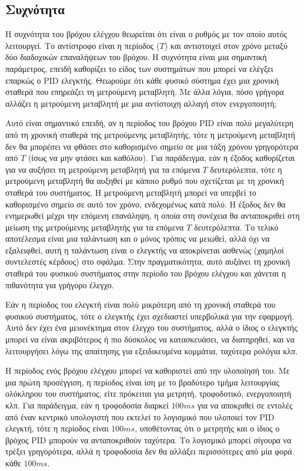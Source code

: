 \subsection{Συχνότητα}

Η συχνότητα του βρόχου ελέγχου θεωρείται ότι είναι ο ρυθμός με τον οποίο αυτός λειτουργεί. Το αντίστροφο είναι η περίοδος ($Τ$) και αντιστοιχεί στον χρόνο μεταξύ δύο διαδοχικών επαναλήψεων του βρόχου. Η συχνότητα είναι μια σημαντική παράμετρος, επειδή καθορίζει το είδος των συστημάτων που μπορεί να ελέγξει επαρκώς ο PID ελεγκτής. Θεωρούμε ότι κάθε φυσικό σύστημα έχει μια χρονική σταθερά που επηρεάζει τη μετρούμενη μεταβλητή. Με άλλα λόγια, πόσο γρήγορα αλλάζει η μετρούμενη μεταβλητή με μια αντίστοιχη αλλαγή στον ενεργοποιητή;

Αυτό είναι σημαντικό επειδή, αν η περίοδος του βρόχου PID είναι πολύ μεγαλύτερη από τη χρονική σταθερά της μετρούμενης μεταβλητής, τότε η μετρούμενη μεταβλητή δεν θα μπορέσει να φθάσει στο καθορισμένο σημείο σε μια τάξη χρόνου γρηγορότερα από $T$ (ίσως να μην φτάσει και καθόλου). Για παράδειγμα, εάν η έξοδος καθορίζεται για να αυξήσει τη μετρούμενη μεταβλητή για τα επόμενα $T$ δευτερόλεπτα, τότε η μετρούμενη μεταβλητή θα αυξηθεί με κάποιο ρυθμό που σχετίζεται με τη χρονική σταθερά του συστήματος. Η μετρούμενη μεταβλητή μπορεί να υπερβεί το καθορισμένο σημείο σε αυτό τον χρόνο, ενδεχομένως κατά πολύ. Η έξοδος δεν θα ενημερωθεί μέχρι την επόμενη επανάληψη, η οποία στη συνέχεια θα ανταποκριθεί στη μείωση της μετρούμενης μεταβλητής για τα επόμενα $T$ δευτερόλεπτα. Το τελικό αποτέλεσμα είναι μια ταλάντωση και ο μόνος τρόπος να μειωθεί, αλλά όχι να εξαλειφθεί, αυτή η ταλάντωση είναι ο ελεγκτής να αποκρίνεται ασθενώς (χαμηλοί συντελεστές κέρδους) στο σφάλμα. Στην πραγματικότητα, αυτό αυξάνει τη χρονική σταθερά του φυσικού συστήματος στην περίοδο του βρόχου ελέγχου και χάνεται η πιθανότητα για γρήγορο έλεγχο.

Εάν η περίοδος του ελεγκτή είναι πολύ μικρότερη από τη χρονική σταθερά του φυσικού συστήματος, τότε ο ελεγκτής έχει σχεδιαστεί υπερβολικά για την εφαρμογή. Αυτό δεν έχει ένα μειονέκτημα στον έλεγχο του συστήματος, αλλά ο ίδιος ο ελεγκτής μπορεί να είναι ακριβότερος ή πιο δύσκολος να κατασκευάσει, να διατηρηθεί, και να λειτουργήσει λόγω της απαίτησης για εξειδικευμένα κομμάτια, ταχύτερα ρολόγια κλπ.

Η περίοδος ενός βρόχου ελέγχου μπορεί να καθοριστεί από την υλοποίησή του. Με μια πρώτη προσέγγιση, η περίοδος είναι ίση με το βραδύτερο τμήμα λειτουργίας ολόκληρου του συστήματος, είτε πρόκειται για μετρητή, τροφοδοτικό, ενεργοποιητή κλπ. Για παράδειγμα, εάν η τροφοδοσία διαρκεί $100ms$ για να αποκριθεί σε εντολές από έναν κεντρικό υπολογιστή που εκτελεί το λογισμικό που υλοποιεί τον PID ελεγκτή, τότε η περίοδος είναι $100ms$, υποθέτοντας ότι ο μετρητής και ο ίδιος ο βρόχος PID μπορούν να ανταποκριθούν ταχύτερα. Το λογισμικό μπορεί σίγουρα να τρέξει γρηγορότερα, αλλά η τροφοδοσία δεν θα αλλάξει περισσότερες από μία φορά κάθε $100ms$.

